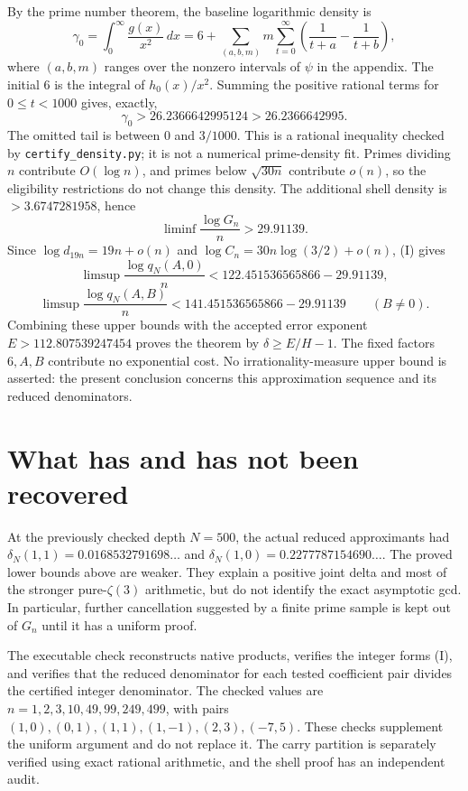 \documentclass[11pt]{article}
\begin{document}
By the prime number theorem, the baseline logarithmic density is
\[
 \gamma_0=\int_0^\infty\frac{g(x)}{x^2}\,dx
 =6+\sum_{(a,b,m)}m\sum_{t=0}^\infty
       \left(\frac1{t+a}-\frac1{t+b}\right),
\]
where $(a,b,m)$ ranges over the nonzero intervals of $\psi$ in the
appendix. The initial $6$ is the integral of $h_0(x)/x^2$.
Summing the positive rational terms for $0\le t<1000$ gives, exactly,
\[
 \gamma_0>26.2366642995124>26.2366642995.
\]
The omitted tail is between $0$ and $3/1000$. This is a rational
inequality checked by \texttt{certify\_density.py}; it is not a numerical
prime-density fit. Primes dividing $n$ contribute $O(\log n)$, and primes
below $\sqrt{30n}$ contribute $o(n)$, so the eligibility restrictions do
not change this density.
The additional shell density is $>3.6747281958$, hence
\[
 \liminf\frac{\log G_n}{n}>29.91139.
\]
Since $\log d_{19n}=19n+o(n)$ and
$\log C_n=30n\log(3/2)+o(n)$, (I) gives
\[
 \limsup\frac{\log q_N(A,0)}n
       <122.451536565866-29.91139,
\]
\[
 \limsup\frac{\log q_N(A,B)}n
       <141.451536565866-29.91139\qquad(B\ne0).
\]
Combining these upper bounds with the accepted error exponent
$E>112.807539247454$ proves the theorem by $\delta\ge E/H-1$.
The fixed factors $6,A,B$ contribute no exponential cost. No
irrationality-measure upper bound is asserted: the present conclusion
concerns this approximation sequence and its reduced denominators.

\section{What has and has not been recovered}
At the previously checked depth $N=500$, the actual reduced approximants
had $\delta_N(1,1)=0.0168532791698\ldots$ and
$\delta_N(1,0)=0.2277787154690\ldots$. The proved lower bounds above are
weaker. They explain a positive joint delta and most of the stronger
pure-$\zeta(3)$ arithmetic, but do not identify the exact asymptotic gcd.
In particular, further cancellation suggested by a finite prime sample
is kept out of $G_n$ until it has a uniform proof.

The executable check reconstructs native products, verifies the integer
forms (I), and verifies that the reduced denominator for each tested
coefficient pair divides the certified integer denominator. The checked
values are $n=1,2,3,10,49,99,249,499$, with pairs
$(1,0),(0,1),(1,1),(1,-1),(2,3),(-7,5)$. These checks supplement the
uniform argument and do not replace it. The carry partition is separately
verified using exact rational arithmetic, and the shell proof has an
independent audit.
\end{document}
